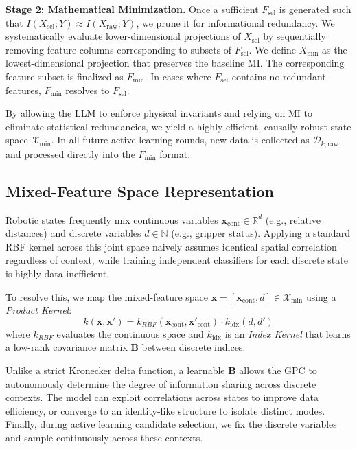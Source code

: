 \documentclass[journal]{IEEEtran}
\begin{document}
\textbf{Stage 2: Mathematical Minimization.} Once a sufficient $F_{\text{sel}}$ is generated such that $I(X_{\text{sel}}; Y) \approx I(X_{\text{raw}}; Y)$, we prune it for informational redundancy. We systematically evaluate lower-dimensional projections of $X_{\text{sel}}$ by sequentially removing feature columns corresponding to subsets of $F_{\text{sel}}$. We define $X_{\text{min}}$ as the lowest-dimensional projection that preserves the baseline MI. The corresponding feature subset is finalized as $F_{\text{min}}$. In cases where $F_{\text{sel}}$ contains no redundant features, $F_{\text{min}}$ resolves to $F_{\text{sel}}$.

By allowing the LLM to enforce physical invariants and relying on MI to eliminate statistical redundancies, we yield a highly efficient, causally robust state space $\mathcal{X}_{\text{min}}$. In all future active learning rounds, new data is collected as $\mathcal{D}_{k,\text{raw}}$ and processed directly into the $F_{\text{min}}$ format.


\subsection{Mixed-Feature Space Representation}
Robotic states frequently mix continuous variables $\mathbf{x}_{\text{cont}} \in \mathbb{R}^d$ (e.g., relative distances) and discrete variables $d \in \mathbb{N}$ (e.g., gripper status). Applying a standard RBF kernel across this joint space naively assumes identical spatial correlation regardless of context, while training independent classifiers for each discrete state is highly data-inefficient.

To resolve this, we map the mixed-feature space $\mathbf{x} = [\mathbf{x}_{\text{cont}}, d] \in \mathcal{X}_{\text{min}}$ using a \textit{Product Kernel}:
\begin{equation}
k(\mathbf{x}, \mathbf{x}') = k_{RBF}(\mathbf{x}_{\text{cont}}, \mathbf{x}'_{\text{cont}}) \cdot k_{\text{idx}}(d, d')
\end{equation}
where $k_{RBF}$ evaluates the continuous space and $k_{\text{idx}}$ is an \textit{Index Kernel} that learns a low-rank covariance matrix $\mathbf{B}$ between discrete indices.

Unlike a strict Kronecker delta function, a learnable $\mathbf{B}$ allows the GPC to autonomously determine the degree of information sharing across discrete contexts. The model can exploit correlations across states to improve data efficiency, or converge to an identity-like structure to isolate distinct modes. Finally, during active learning candidate selection, we fix the discrete variables and sample continuously across these contexts.
\end{document}

